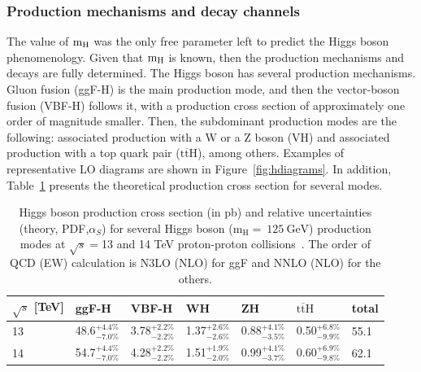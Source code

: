 \subsubsection{Production mechanisms and decay channels}
The value of $\mathrm{m_{H}}$ was the only free parameter left to predict the Higgs boson phenomenology. Given that $\mathrm{m_{H}}$ is known, then the production mechanisms and decays are fully determined. The Higgs boson has several production mechanisms. Gluon fusion (ggF-H) is the main production mode, and then the vector-boson fusion (VBF-H) follows it, with a production cross section of approximately one order of magnitude smaller. Then, the subdominant production modes are the following: associated production with a W or a Z boson (VH) and associated production with a top quark pair ($\mathrm{t\overline{t}H}$), among others. Examples of representative LO diagrams are shown in Figure~\ref{fig:hdiagrams}. In addition, Table~\ref{tab:higgsmodes} presents the theoretical production cross section for several modes. 

\begin{table}[htb]
\centering
\caption[Higgs boson production cross section and relative uncertainties]{\label{tab:higgsmodes} Higgs boson production cross section (in pb) and relative uncertainties (theory, PDF,$\alpha_{S}$) for several Higgs boson ($\mathrm{m_{H}=~125~GeV}$) production modes at $\sqrt{s}=$13 and 14 TeV proton-proton collisions~\cite{pdg}. The order of QCD (EW) calculation is N3LO (NLO) for ggF and NNLO (NLO) for the others.}
\begin{tabularx}{\textwidth}{XXXXXXX}
\hline
$\sqrt{s}$ [TeV] & ggF-H                          &      VBF-H                  & WH                         & ZH                         & $\mathrm{t\overline{t}H}$ & total \\
\hline
13 &  48.6$^{+4.4\%}_{-7.0\%}$ &  3.78$^{+2.2\%}_{-2.2\%}$ &  1.37$^{+2.6\%}_{-2.6\%}$  &  0.88$^{+4.1\%}_{-3.5\%}$  & 0.50$^{+6.8\%}_{-9.9\%}$ & 55.1 \\[0pt]
14 &  54.7$^{+4.4\%}_{-7.0\%}$ &  4.28$^{+2.2\%}_{-2.2\%}$ &  1.51$^{+1.9\%}_{-2.0\%}$  &  0.99$^{+4.1\%}_{-3.7\%}$  & 0.60$^{+6.9\%}_{-9.8\%}$ & 62.1 \\[0pt]
\hline
\end{tabularx}
\end{table}

